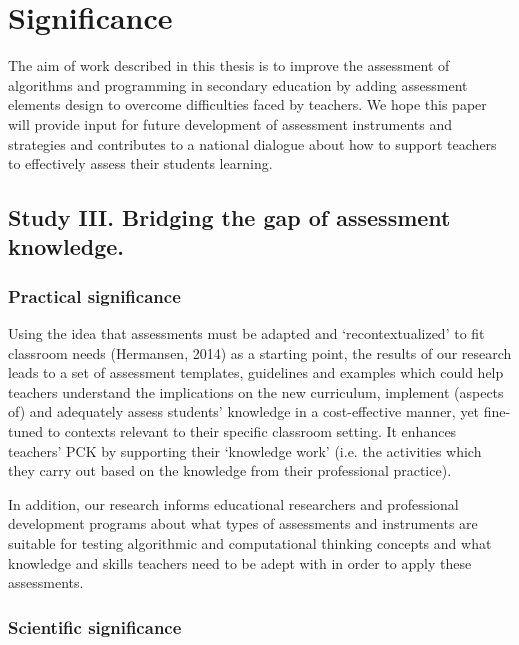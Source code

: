 \section{Significance}\label{sec:significance}

The aim of work described in this thesis is to improve the assessment of algorithms and programming in secondary education by adding assessment elements design to overcome difficulties faced by teachers. We hope this paper will provide input for future development of assessment instruments and strategies and contributes to a national dialogue about how to support teachers to effectively assess their students learning.

\subsection{Study III. Bridging the gap of assessment knowledge.}
\subsubsection*{Practical significance}
Using the idea that assessments must be adapted and ‘recontextualized’ to fit classroom needs (Hermansen, 2014) as a starting point, the results of our research leads to a set of assessment templates, guidelines and examples which could help teachers understand the implications on the new curriculum, implement (aspects of) and adequately assess students’ knowledge in a cost-effective manner, yet fine-tuned to contexts relevant to their specific classroom setting. It enhances teachers’ PCK by supporting their ‘knowledge work’ (i.e. the activities which they carry out based on the knowledge from their professional practice).%

In addition, our research informs educational researchers and professional development programs about what types of assessments and instruments are suitable for testing algorithmic and computational thinking concepts and what knowledge and skills teachers need to be adept with in order to apply these assessments.

\subsubsection*{Scientific significance}


